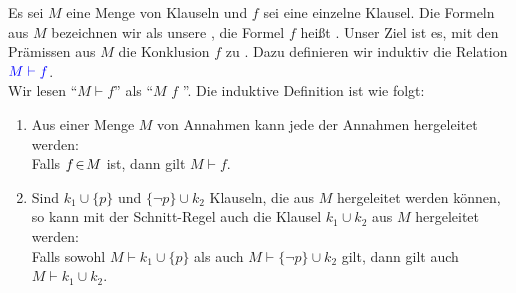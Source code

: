 \begin{Definition}
    Es sei $M$ eine Menge von Klauseln  und $f$ sei eine einzelne Klausel.  
    Die Formeln aus $M$ bezeichnen wir als unsere , die Formel
    $f$ heißt .  Unser Ziel ist es, mit den Prämissen aus $M$
    die Konklusion $f$ zu .  Dazu definieren wir induktiv die Relation \\[0.2cm]
    \hspace*{1.3cm}
    ${\color{blue}M \vdash f}$. \\[0.2cm]
    Wir lesen ``$M \vdash f$'' als ``$M$  $f$ ''.  Die induktive Definition ist
    wie folgt:
    \begin{enumerate}
    \item Aus einer Menge $M$ von Annahmen kann jede der Annahmen hergeleitet werden: \\[0.2cm]
          \hspace*{1.3cm} 
          Falls $f \!\in\! M$ ist, dann gilt  $M \vdash f$.
    \item Sind $k_1 \cup \{p\}$ und $\{ \neg p \} \cup k_2$ Klauseln, die aus $M$
          hergeleitet werden können, so kann mit der Schnitt-Regel auch die Klausel $k_1 \cup k_2$ aus $M$
          hergeleitet werden: \\[0.2cm]
          \hspace*{1.3cm} 
          Falls sowohl $M \vdash k_1 \cup \{p\}$ als auch $M \vdash \{ \neg p \} \cup k_2$
          gilt, dann gilt auch $M \vdash k_1 \cup k_2$.
    \eox
    \end{enumerate}
\end{Definition}



